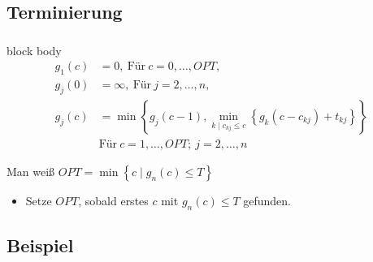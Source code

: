 \documentclass{beamer}
\begin{document}
\subsection{Terminierung}

\begin{frame}
   \frametitle{\insertsection}
   \framesubtitle{\insertsubsection}

   \begin{beamercolorbox}[center,wd=\paperwidth]{block body}
      \begin{align*}
         g_1(c) & =  0, ~ \text{Für} ~ c = 0,\ldots,OPT, \\
         g_j(0) & =  \infty, ~ \text{Für} ~ j = 2,\ldots,n, \\
         g_j(c) & =  \min\left\{g_j(c-1), \min_{k \mid c_{kj} \le c}\left\{g_k(c-c_{kj}) + t_{kj}\right\}\right\} \\
                & \text{Für} ~ c= 1,\ldots,OPT; ~j = 2,\ldots,n
      \end{align*}
   \end{beamercolorbox}

   Man weiß $OPT=\min\left\{c \mid g_n(c) \le T\right\}$
   \begin{itemize}
      \item Setze $OPT$, sobald erstes $c$ mit $g_n(c)\le T$ gefunden.
   \end{itemize}
\end{frame}


\subsection{Beispiel}
\end{document}
